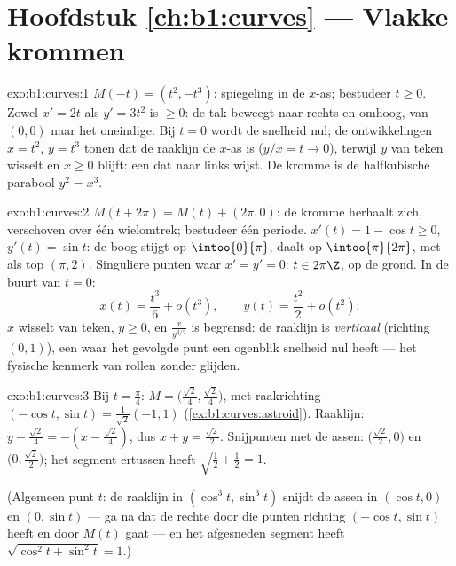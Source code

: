 \section*{Hoofdstuk \ref{ch:b1:curves} --- Vlakke krommen}

\begin{solution}{exo:b1:curves:1}
$M(-t) = (t^2, -t^3)$: spiegeling in de $x$-as; bestudeer $t \geq
0$. Zowel $x' = 2t$ als $y' = 3t^2$ is $\geq 0$: de tak beweegt naar
rechts en omhoog, van $(0,0)$ naar het oneindige. Bij $t = 0$ wordt
de snelheid nul; de ontwikkelingen $x = t^2$, $y = t^3$ tonen dat de
raaklijn de $x$-as is ($y/x = t \to 0$), terwijl $y$ van teken
wisselt en $x \geq 0$ blijft: een \emph{} dat naar links
wijst. De kromme is de halfkubische parabool $y^2 = x^3$.
\end{solution}

\begin{solution}{exo:b1:curves:2}
$M(t + 2\pi) = M(t) + (2\pi, 0)$: de kromme herhaalt zich,
verschoven over één wielomtrek; bestudeer één periode. $x'(t) = 1 -
\cos t \geq 0$, $y'(t) = \sin t$: de boog stijgt op
$\intoo{0}{\pi}$, daalt op $\intoo{\pi}{2\pi}$, met als top $(\pi,
2)$. Singuliere punten waar $x' = y' = 0$: $t \in 2\pi\Z$, op de
grond. In de buurt van $t = 0$:
\[
x(t) = \frac{t^3}{6} + o(t^3),
\qquad
y(t) = \frac{t^2}{2} + o(t^2):
\]
$x$ wisselt van teken, $y \geq 0$, en $\frac{x}{y^{3/2}}$ is
begrensd: de raaklijn is \emph{verticaal} (richting $(0,1)$), een
 waar het gevolgde punt een ogenblik snelheid nul heeft ---
het fysische kenmerk van rollen zonder glijden.
\end{solution}

\begin{solution}{exo:b1:curves:3}
Bij $t = \frac\pi4$: $M = \bigl(\frac{\sqrt2}{4},
\frac{\sqrt2}{4}\bigr)$, met raakrichting $(-\cos t, \sin t) =
\frac{1}{\sqrt2}(-1, 1)$ (\cref{ex:b1:curves:astroid}). Raaklijn: $y
- \frac{\sqrt2}{4} = -(x - \frac{\sqrt2}{4})$, dus $x + y =
\frac{\sqrt2}{2}$. Snijpunten met de assen:
$\bigl(\frac{\sqrt2}{2}, 0\bigr)$ en $\bigl(0,
\frac{\sqrt2}{2}\bigr)$; het segment ertussen heeft 
$\sqrt{\frac12 + \frac12} = 1$.

(Algemeen punt $t$: de raaklijn in $(\cos^3 t, \sin^3 t)$ snijdt de
assen in $(\cos t, 0)$ en $(0, \sin t)$ --- ga na dat de rechte door
die punten richting $(-\cos t, \sin t)$ heeft en door $M(t)$ gaat
--- en het afgesneden segment heeft  $\sqrt{\cos^2 t + \sin^2
t} = 1$.)
\end{solution}

